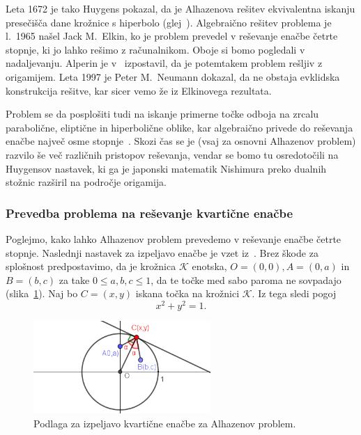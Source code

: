 Leta 1672 je tako Huygens pokazal, da je Alhazenova rešitev ekvivalentna iskanju presečišča dane krožnice s hiperbolo (glej~\cite{nishimura2018}). Algebraično rešitev problema je l.\ 1965 našel Jack M.\ Elkin, ko je problem prevedel v reševanje enačbe četrte stopnje, ki jo lahko rešimo z računalnikom. Oboje si bomo pogledali v nadaljevanju. Alperin je v~\cite{alperin2002} izpostavil, da je potemtakem problem rešljiv z origamijem. Leta 1997 je Peter M.\ Neumann dokazal, da ne obstaja evklidska konstrukcija rešitve, kar sicer vemo že iz Elkinovega rezultata.

Problem se da posplošiti tudi na iskanje primerne točke odboja na zrcalu parabolične, eliptične in hiperbolične oblike, kar algebraično privede do reševanja enačbe največ osme stopnje~\cite{alhproblemwiki}. Skozi čas se je (vsaj za osnovni Alhazenov problem) razvilo še več različnih pristopov reševanja, vendar se bomo tu osredotočili na Huygensov nastavek, ki ga je japonski matematik Nishimura preko dualnih stožnic razširil na področje origamija.

\subsubsection*{Prevedba problema na reševanje kvartične enačbe}

Poglejmo, kako lahko Alhazenov problem prevedemo v reševanje enačbe četrte stopnje. Naslednji nastavek za izpeljavo enačbe je vzet iz~\cite[138--139]{geometricconstructions}. Brez škode za splošnost predpostavimo, da je krožnica $\mathcal{K}$ enotska, $O = (0,0), A = (0,a)$ in $B=(b,c)$ za take $0 \leq a, b, c \leq 1$, da te točke med sabo paroma ne sovpadajo (slika~\ref{fig:alhazen2}). Naj bo $C=(x,y)$ iskana točka na krožnici $\mathcal{K}$. Iz tega sledi pogoj
\begin{equation}
    \label{eq:pogoj_alh1}
    x^2 + y^2 = 1.
\end{equation}

\begin{figure}[h]
    \centering
    \includegraphics[width=0.6\textwidth]{images/alhazen/alhazen2.png}
    \caption[Alhazenov problem -- izpeljava]{Podlaga za izpeljavo kvartične enačbe za Alhazenov problem.}
    \label{fig:alhazen2}
\end{figure}

